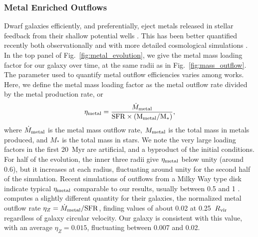 \documentclass[twocolumn]{aastex61}
\begin{document}
\subsubsection{Metal Enriched Outflows}
Dwarf galaxies efficiently, and preferentially, eject metals released in stellar feedback from their shallow potential wells \citep{MacLowFerrara1999,FerraraTolstoy2000}. This has been better quantified recently both observationally \citep[e.g.][]{Kirby2011-metals,Zahid2012,Peeples2014,McQuinn2015} and with more detailed cosmological simulations \citep{Simpson2013,Angles-Alcazar2017,Muratov2017}. In the top panel of Fig.~\ref{fig:metal_evolution}, we give the metal mass loading factor for our galaxy over time, at the same radii as in Fig.~\ref{fig:mass_outflow}. The parameter used to quantify metal outflow efficiencies varies among works. Here, we define the metal mass loading factor as the metal outflow rate divided by the metal production rate, or
\begin{equation} \label{eq:eta-metal}
\eta_{\rm metal} = \frac{\dot{M}_{\rm metal}}{\rm{SFR} \times (M_{\rm metal}/M_{*})},
\end{equation}
where $\dot{M}_{\rm metal}$ is the metal mass outflow rate, $M_{\rm metal}$ is the total mass in metals produced, and $M_{*}$ is the total mass in stars. We note the very large loading factors in the first 20~Myr are artificial, and a byproduct of the initial conditions. For half of the evolution, the inner three radii give $\eta_{\rm metal}$ below unity (around 0.6), but it increases at each radius, fluctuating around unity for the second half of the simulation. Recent simulations of outflows from a Milky Way type disk indicate typical $\eta_{\rm metal}$ comparable to our results, usually between 0.5 and 1 \citep{Li2017,Fielding2017}. \cite{Muratov2017} computes a slightly different quantity for their galaxies, the normalized metal outflow rate $\eta_{Z} = \dot{M}_{\rm metal}/{\rm SFR}$, finding values of about 0.02 at 0.25~$R_{\rm vir}$ regardless of galaxy circular velocity. Our galaxy is consistent with this value, with an average $\eta_Z = 0.015$, fluctuating between 0.007 and 0.02.
\end{document}
